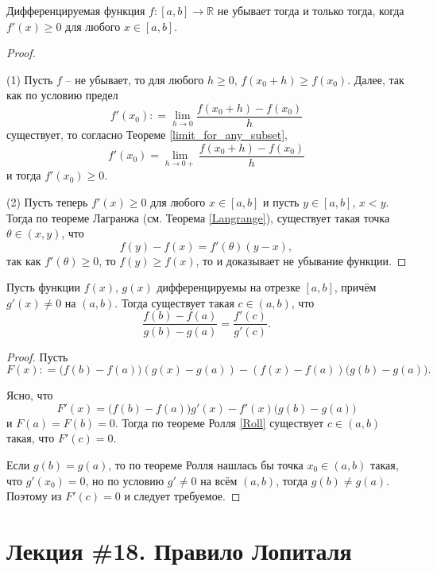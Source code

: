 \begin{corollary}\label{monoton_criteria}
    Дифференцируемая функция $f:[a,b] \to \mathbb{R}$ не убывает тогда и только тогда, когда $f'(x) \ge 0$ для любого $x \in [a,b].$
\end{corollary}
\begin{proof}~

(1) Пусть $f$ -- не убывает, то для любого $h \ge 0$, $f(x_0 + h ) \ge f(x_0)$. Далее, так как по условию предел
\[
 f'(x_0) : = \lim_{h \to 0} \frac{f(x_0 + h) - f(x_0)}{h} 
\]
существует, то согласно Теореме \ref{limit_for_any_subset},
\[
 f'(x_0) = \lim_{h \to 0+} \frac{f(x_0 + h) - f(x_0)}{h}
\]
и тогда $f'(x_0) \ge 0$.

(2) Пусть теперь $f'(x)\ge 0$ для любого $x \in [a,b]$ и пусть $y\in [a,b]$, $x <y$. Тогда по теореме Лагранжа (см. Теорема \ref{Langrange}), существует такая точка $\theta \in (x,y)$, что 
\[
 f(y) - f(x) = f'(\theta) (y-x),
\]
так как $f'(\theta) \ge 0$, то $f(y) \ge f(x)$, то и доказывает не убывание функции.    
\end{proof}



\begin{theorem}[Коши]\label{Coushy_for_functions}
    Пусть функции $f(x)$, $g(x)$ дифференцируемы на отрезке $[a,b]$, причём $g'(x) \ne 0$ на $(a,b)$. Тогда существует такая $c \in (a,b)$, что 
    \[
     \frac{f(b) -f(a)}{g(b) - g(a)} = \frac{f'(c)}{g'(c)}.
    \]
\end{theorem}

\begin{proof}
    Пусть
    \[
     F(x): = \bigl(f(b)-f(a) \bigr) (g(x)-g(a)) - ( f(x)- f(a)) \bigl(g(b) - g(a)\bigr).
    \]

    Ясно, что
    \[
     F'(x) = \bigl(f(b)-f(a) \bigr) g'(x) - f'(x)\bigl(g(b) - g(a)\bigr)
    \]
и $F(a) = F(b) =0$. Тогда по теореме Ролля \ref{Roll} существует $c\in (a,b)$ такая, что $F'(c) = 0.$

Если $g(b) = g(a)$, то по теореме Ролля нашлась бы точка $x_0 \in (a,b)$ такая, что $g'(x_0) = 0$, но по условию $g' \ne 0$ на всём $(a,b)$, тогда $g(b) \ne g(a)$. Поэтому из $F'(c)=0$ и следует требуемое.

\end{proof}


\section{Лекция \#18. Правило Лопиталя}


